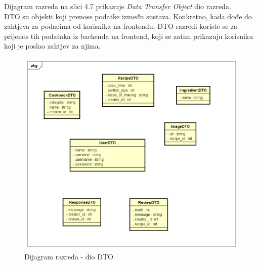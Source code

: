 Dijagram razreda na slici 4.7 prikazuje \textit{Data Transfer Object} dio razreda. \\
DTO su objekti koji prenose podatke između sustava. Konkretno, kada dođe do zahtjeva za podacima od korisnika na frontendu, DTO razredi koriste se za prijenos tih podataka iz backenda na frontend, koji se zatim prikazuju korisniku koji je poslao zahtjev za njima.

			\begin{figure}[H]
			\includegraphics[scale=0.2]{dijagrami/UML_dijagram_razreda_dtos.png} %
			\centering
			\caption{Dijagram razreda - dio DTO}
			\label{Dijagram razreda - dio DTO}
		\end{figure}

